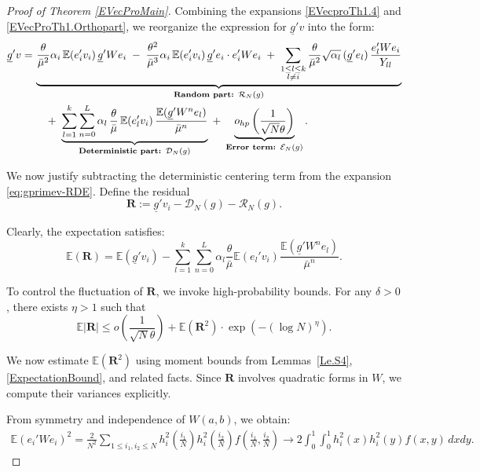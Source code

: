 \documentclass[11pt, reqno]{amsart}
\numberwithin{equation}{section}
\begin{document}
\begin{proof}[Proof of Theorem \ref{EVecProMain}]
Combining the expansions \eqref{EVecproTh1.4} and \eqref{EVecProTh1.Orthopart}, we reorganize the expression for \( \underline{g}' v \) into the form:
\begin{align}
\underline{g}' v 
=\, &\underbrace{
\frac{\theta}{\bar{\mu}^2} \alpha_i\, \mathbb{E}(e_i' v_i)\, \underline{g}' W e_i 
\;-\; \frac{\theta^2}{\bar{\mu}^3} \alpha_i\, \mathbb{E}(e_i' v_i)\, \underline{g}' e_i \cdot e_i' W e_i 
\;+\; \sum_{\substack{1 \le l \le k \\ l \ne i}} \frac{\theta}{\bar{\mu}^2} \sqrt{\alpha_l}\, (\underline{g}' e_l)\, \frac{e_l' W e_i}{Y_{ll}}
}_{\text{\bf Random part: }\mathcal{R}_N(g)}
\\
&\quad +\; \underbrace{
\sum_{l=1}^k \sum_{n=0}^L \alpha_l\, \frac{\theta}{\bar{\mu}}\, \mathbb{E}(e_l' v_i)\, \frac{ \mathbb{E}(\underline{g}' W^n e_l) }{ \bar{\mu}^n }
}_{\text{\bf Deterministic part: }\mathcal{D}_N(g)}
\;+\; \underbrace{o_{hp}\left( \frac{1}{\sqrt{N} \theta} \right)}_{\text{\bf Error term: }\mathcal{E}_N(g)}.
\label{eq:gprimev-RDE}
\end{align}

We now justify subtracting the deterministic centering term from the expansion \eqref{eq:gprimev-RDE}. Define the residual
\begin{equation}
\label{EVecproTh1.Rem}
\mathbf{R} := \underline g'v_i -\mathcal D_N(g)- \mathcal{R}_N(g).
\end{equation}

Clearly, the expectation satisfies:
\[
\mathbb{E}(\mathbf{R}) = \mathbb{E}(\underline{g}' v_i) - \sum_{l=1}^k\sum_{n=0}^L \alpha_l \frac{\theta}{\bar \mu} \mathbb{E}(e_l' v_i)  \frac{\mathbb{E}(\underline{g}' W^n e_l)}{\bar \mu^n}.
\]

To control the fluctuation of \( \mathbf{R} \), we invoke high-probability bounds. For any \( \delta > 0 \), there exists \( \eta > 1 \) such that
\[
\mathbb{E}|\mathbf{R}| \le o\left( \frac{1}{\sqrt{N} \theta} \right) + \mathbb{E}(\mathbf{R}^2) \cdot \exp\left( - (\log N)^\eta \right).
\]

We now estimate \( \mathbb{E}(\mathbf{R}^2) \) using moment bounds from Lemmas~\ref{Le.S4}, \ref{ExpectationBound}, and related facts. Since \( \mathbf{R} \) involves quadratic forms in \( W \), we compute their variances explicitly.

From symmetry and independence of \( W(a,b) \), we obtain:
\begin{align}
\label{EVecproTh1.5}
\mathbb{E}(e_i' W e_i)^2 
= \frac{2}{N^2} \sum_{1 \le i_1, i_2 \le N} h_i^2\left( \frac{i_1}{N} \right) h_i^2\left( \frac{i_2}{N} \right) f\left( \frac{i_1}{N}, \frac{i_2}{N} \right) 
\to 2 \int_0^1 \int_0^1 h_i^2(x) h_i^2(y) f(x,y)\, dxdy.
\end{align}


\end{proof}
\end{document}
